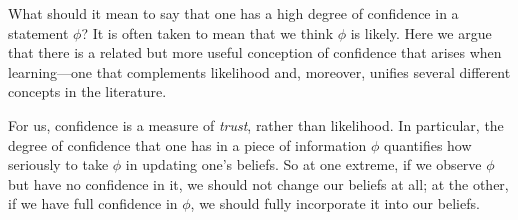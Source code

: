 \def\stmt{$A$}



What should it mean to say that one has a high degree of confidence in a statement $\phi$?  It is often taken to mean that we think $\phi$ is likely. 
Here we argue that there is a related but more useful conception of confidence that arises when learning---one that complements likelihood and, moreover, unifies several different concepts in the literature.

For us, confidence is a measure of \emph{trust}, rather than likelihood.
In particular, the {degree of confidence} that one has in a piece of information $\phi$
quantifies how seriously to take $\phi$ in updating one's beliefs. 
So at one extreme,
if we observe $\phi$ but have no confidence in it, 
we should not change our beliefs at all;
at the other, if we have full confidence in $\phi$,
 we should fully incorporate it into our beliefs.

